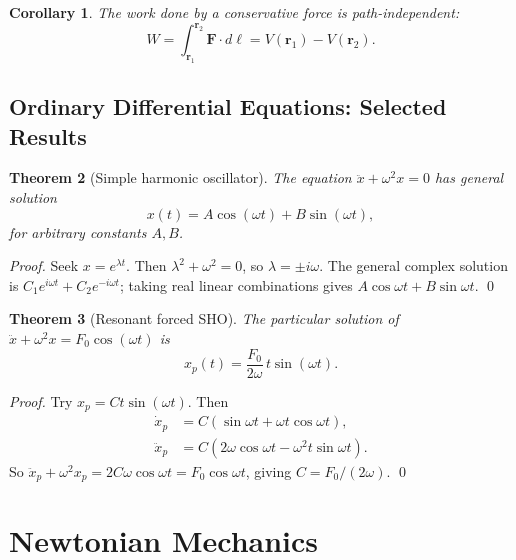 \documentclass[12pt,a4paper]{article}
\theoremstyle{plain}
\newtheorem{theorem}{Theorem}[section]
\newtheorem{corollary}[theorem]{Corollary}
\theoremstyle{definition}
\theoremstyle{remark}
\newcommand{\ve}[1]{\mathbf{#1}}           %
\newcommand{\rv}{\ve{r}}
\begin{document}
\begin{corollary}
The work done by a conservative force is path-independent:
\[
  W = \int_{\rv_1}^{\rv_2}\ve{F}\cdot d\boldsymbol\ell = V(\rv_1) - V(\rv_2).
\]
\end{corollary}

\subsection{Ordinary Differential Equations: Selected Results}

\begin{theorem}[Simple harmonic oscillator]
The equation $\ddot{x} + \omega^2 x = 0$ has general solution
\[
  x(t) = A\cos(\omega t) + B\sin(\omega t),
\]
for arbitrary constants $A,B$.
\end{theorem}
\begin{proof}
Seek $x=e^{\lambda t}$. Then $\lambda^2+\omega^2=0$, so $\lambda=\pm i\omega$. The general complex solution is $C_1 e^{i\omega t}+C_2 e^{-i\omega t}$; taking real linear combinations gives $A\cos\omega t + B\sin\omega t$. \qed
\end{proof}

\begin{theorem}[Resonant forced SHO]\label{thm:resonant}
The particular solution of $\ddot{x}+\omega^2 x = F_0\cos(\omega t)$ is
\[
  x_p(t) = \frac{F_0}{2\omega}\,t\sin(\omega t).
\]
\end{theorem}
\begin{proof}
Try $x_p = Ct\sin(\omega t)$. Then
\begin{align*}
  \dot{x}_p &= C(\sin\omega t + \omega t\cos\omega t),\\
  \ddot{x}_p &= C(2\omega\cos\omega t - \omega^2 t\sin\omega t).
\end{align*}
So $\ddot{x}_p + \omega^2 x_p = 2C\omega\cos\omega t = F_0\cos\omega t$, giving $C = F_0/(2\omega)$. \qed
\end{proof}

\section{Newtonian Mechanics}

\end{document}
